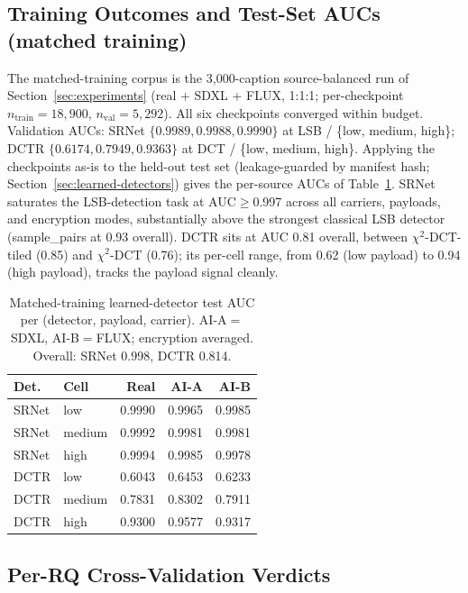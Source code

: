 \documentclass[10pt,twocolumn,a4paper]{article}
\begin{document}
\subsection{Training Outcomes and Test-Set AUCs (matched training)}
\label{sec:v1-train}

The matched-training corpus is the 3{,}000-caption source-balanced run of Section~\ref{sec:experiments} (real + SDXL + FLUX, 1:1:1; per-checkpoint $n_\text{train}\!=\!18{,}900$, $n_\text{val}\!=\!5{,}292$). All six checkpoints converged within budget. Validation AUCs: SRNet $\{0.9989, 0.9988, 0.9990\}$ at LSB / \{low, medium, high\}; DCTR $\{0.6174, 0.7949, 0.9363\}$ at DCT / \{low, medium, high\}. Applying the checkpoints as-is to the held-out test set (leakage-guarded by manifest hash; Section~\ref{sec:learned-detectors}) gives the per-source AUCs of Table~\ref{tab:learned-headline-auc}. SRNet saturates the LSB-detection task at AUC$\geq$0.997 across all carriers, payloads, and encryption modes, substantially above the strongest classical LSB detector (sample\_pairs at 0.93 overall). DCTR sits at AUC 0.81 overall, between $\chi^2$-DCT-tiled (0.85) and $\chi^2$-DCT (0.76); its per-cell range, from 0.62 (low payload) to 0.94 (high payload), tracks the payload signal cleanly.

\begin{table}[!htbp]
\centering\footnotesize
\caption{Matched-training learned-detector test AUC per (detector, payload, carrier). AI-A$=$SDXL, AI-B$=$FLUX; encryption averaged. Overall: SRNet 0.998, DCTR 0.814.}
\label{tab:learned-headline-auc}
\setlength{\tabcolsep}{5pt}\renewcommand{\arraystretch}{1.05}
\begin{tabular}{@{}llrrr@{}}
\toprule
\textbf{Det.} & \textbf{Cell} & \textbf{Real} & \textbf{AI-A} & \textbf{AI-B} \\
\midrule
SRNet & low     & 0.9990 & 0.9965 & 0.9985 \\
SRNet & medium  & 0.9992 & 0.9981 & 0.9981 \\
SRNet & high    & 0.9994 & 0.9985 & 0.9978 \\
DCTR  & low     & 0.6043 & 0.6453 & 0.6233 \\
DCTR  & medium  & 0.7831 & 0.8302 & 0.7911 \\
DCTR  & high    & 0.9300 & 0.9577 & 0.9317 \\
\bottomrule
\end{tabular}
\end{table}

\subsection{Per-RQ Cross-Validation Verdicts}
\end{document}
